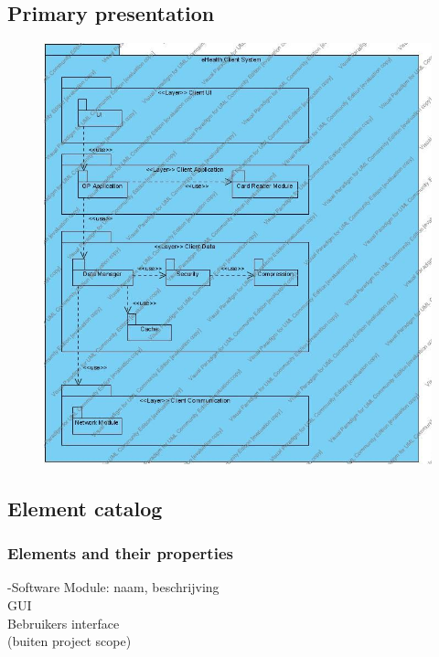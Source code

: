\documentclass[a4paper,10pt]{article}
\begin{document}
\subsection{Primary presentation}
\begin{center}
    \begin{figure}[h!]
      \includegraphics[width=\textwidth]{../images/UsesView_Client.jpg}
    \end{figure}
  \end{center}

\subsection{Element catalog}

\subsubsection{Elements and their properties}

-Software Module: naam, beschrijving\\

GUI\\
Bebruikers interface\\
(buiten project scope)\\
\end{document}

